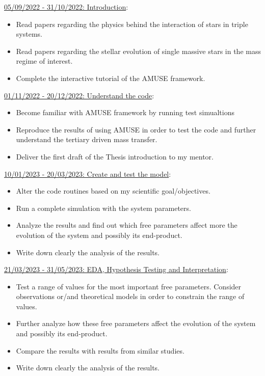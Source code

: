 \documentclass{uva-inf-article}
\numberwithin{equation}{section}
\begin{document}
\underline{05/09/2022 - 31/10/2022: Introduction}:\\
\begin{itemize}
    \item Read papers regarding the physics behind the interaction of stars in triple systems.
    \item Read papers regarding the stellar evolution of single massive stars in the mass regime of interest. 
    \item Complete the interactive tutorial of the AMUSE framework.
\end{itemize}

\hspace*{-0.7cm}\underline{01/11/2022 - 20/12/2022: Understand the code}:
\begin{itemize}
    \item Become familiar with AMUSE framework by running test simualtions
    \item Reproduce the results of \citep{de2014evolution} using AMUSE in order to test the code and further understand the tertiary driven mass transfer.
    \item Deliver the first draft of the Thesis introduction to my mentor.
\end{itemize}

\hspace*{-0.7cm}\underline{10/01/2023 - 20/03/2023: Create and test the model}:
\begin{itemize}
    \item Alter the code routines based on my scientific goal/objectives.
    \item  Run a complete simulation with the system parameters.
    \item  Analyze the results and find out which free parameters affect more the evolution of the system and possibly its end-product.
    \item Write down clearly the analysis of the results.
\end{itemize}

\hspace*{-0.7cm}\underline{21/03/2023 - 31/05/2023: EDA, Hypothesis Testing and Interpretation}:
\begin{itemize}
    \item Test a range of values for the most important free parameters. Consider observations or/and theoretical models in order to constrain the range of values.
    \item Further analyze how these free parameters affect the evolution of the system and possibly its end-product.
    \item Compare the results with results from similar studies.
    \item  Write down clearly the analysis of the results.
\end{itemize}
\end{document}
